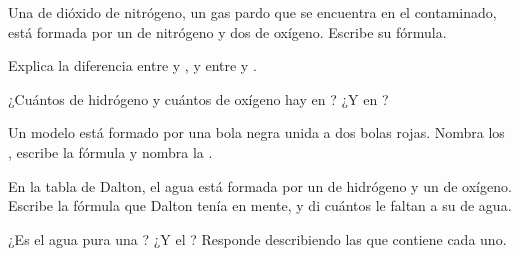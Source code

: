 \begin{exercise}[$\star$]\label{exo:g7:atoms-and-molecules:5}
Una  de dióxido de nitrógeno, un gas pardo que se encuentra en
el  contaminado, está formada por un  de nitrógeno y dos
 de oxígeno. Escribe su fórmula.
\end{exercise}

\begin{exercise}[$\star\star$]\label{exo:g7:atoms-and-molecules:6}
Explica la diferencia entre  y , y entre  y
.
\end{exercise}

\begin{exercise}[$\star\star$]\label{exo:g7:atoms-and-molecules:7}
¿Cuántos  de hidrógeno y cuántos  de oxígeno hay en
? ¿Y en ?
\end{exercise}

\begin{exercise}[$\star\star$]\label{exo:g7:atoms-and-molecules:8}
Un modelo está formado por una bola negra unida a dos bolas rojas.
Nombra los , escribe la fórmula y nombra la .
\end{exercise}

\begin{exercise}[$\star\star$]\label{exo:g7:atoms-and-molecules:9}
En la tabla de Dalton, el agua está formada por un  de hidrógeno y
un  de oxígeno. Escribe la fórmula que Dalton tenía en mente, y di
cuántos  le faltan a su  de agua.
\end{exercise}

\begin{exercise}[$\star\star$]\label{exo:g7:atoms-and-molecules:10}
¿Es el agua pura una ? ¿Y el ? Responde describiendo las
 que contiene cada uno.
\end{exercise}

